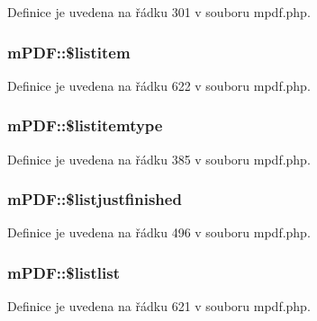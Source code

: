 Definice je uvedena na řádku 301 v souboru mpdf.\-php.

\hypertarget{classm_p_d_f_a0bd46fc876e6fbeeace7db04d2d9a3b9}{
\subsubsection[{\$listitem}]{\setlength{\rightskip}{0pt plus 5cm}m\-P\-D\-F\-::\$listitem}}\label{classm_p_d_f_a0bd46fc876e6fbeeace7db04d2d9a3b9}


Definice je uvedena na řádku 622 v souboru mpdf.\-php.

\hypertarget{classm_p_d_f_afe458ec835625d098a11ef7e19e33eca}{
\subsubsection[{\$listitemtype}]{\setlength{\rightskip}{0pt plus 5cm}m\-P\-D\-F\-::\$listitemtype}}\label{classm_p_d_f_afe458ec835625d098a11ef7e19e33eca}


Definice je uvedena na řádku 385 v souboru mpdf.\-php.

\hypertarget{classm_p_d_f_aace253794f7fb731575d8ad0b694775d}{
\subsubsection[{\$listjustfinished}]{\setlength{\rightskip}{0pt plus 5cm}m\-P\-D\-F\-::\$listjustfinished}}\label{classm_p_d_f_aace253794f7fb731575d8ad0b694775d}


Definice je uvedena na řádku 496 v souboru mpdf.\-php.

\hypertarget{classm_p_d_f_a5b9d4d13aecade71f78e99d621c1dafb}{
\subsubsection[{\$listlist}]{\setlength{\rightskip}{0pt plus 5cm}m\-P\-D\-F\-::\$listlist}}\label{classm_p_d_f_a5b9d4d13aecade71f78e99d621c1dafb}


Definice je uvedena na řádku 621 v souboru mpdf.\-php.

